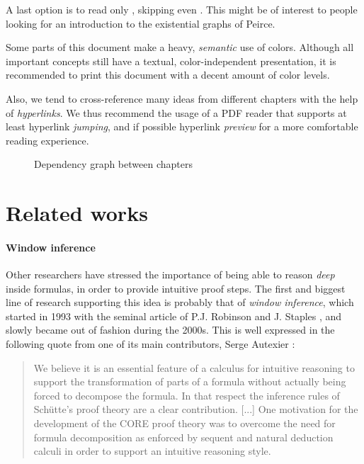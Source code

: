 A last option is to read only , skipping even . This might
be of interest to people looking for an introduction to the existential graphs
of Peirce.

\begin{remark}
  Some parts of this document make a heavy, \emph{semantic} use of colors.
  Although all important concepts still have a textual, color-independent
  presentation, it is recommended to print this document with a decent amount of
  color levels.
  
  Also, we tend to cross-reference many ideas from different chapters with the
  help of \emph{hyperlinks}. We thus recommend the usage of a PDF reader that
  supports at least hyperlink \emph{jumping}, and if possible hyperlink
  \emph{preview} for a more comfortable reading experience.
\end{remark}

\begin{figure*}
  \caption{Dependency graph between chapters}
\end{figure*}


\section{Related works}

\paragraph{Window inference}

Other researchers have stressed the importance of being able to reason
\emph{deep} inside formulas, in order to provide intuitive proof steps. The
first and biggest line of research supporting this idea is probably that of
\emph{window inference}, which started in 1993 with the seminal article of P.J.
Robinson and J. Staples , and slowly became
out of fashion during the 2000s. This is well expressed in the following quote
from one of its main contributors, Serge Autexier
:

\begin{quote}
We believe it is an essential feature of a calculus for intuitive reasoning to
support the transformation of parts of a formula without actually being forced
to decompose the formula. In that respect the inference rules of Schütte's proof
theory are a clear contribution. [...] One motivation for the development of the
CORE proof theory was to overcome the need for formula decomposition as enforced
by sequent and natural deduction calculi in order to support an intuitive
reasoning style.
\end{quote}

